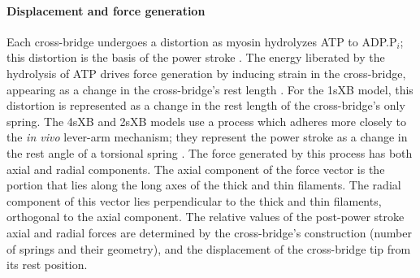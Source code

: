 \documentclass[10pt]{article}
\newcommand{\citep}[1]{\cite{#1}} %
\begin{document}
\paragraph{Displacement and force generation} %
Each cross-bridge undergoes a distortion as myosin hydrolyzes ATP to ADP.P$_i$; this distortion is the basis of the power stroke \citep{Pate1989, Daniel1998, Tanner2007}. 
The energy liberated by the hydrolysis of ATP drives force generation by inducing strain in the cross-bridge, appearing as a change in the cross-bridge's rest length \citep{HowardBook}.  
For the 1sXB model, this distortion is represented as a change in the rest length of the cross-bridge's only spring. 
The 4sXB and 2sXB models use a process which adheres more closely to the \emph{in vivo} lever-arm mechanism; they represent the power stroke as a change in the rest angle of a torsional spring \citep{Reedy2000}.
The force generated by this process has both axial and radial components. 
The axial component of the force vector is the portion that lies along the long axes of the thick and thin filaments. 
The radial component of this vector lies perpendicular to the thick and thin filaments, orthogonal to the axial component. 
The relative values of the post-power stroke axial and radial forces are determined by the cross-bridge's construction (number of springs and their geometry), and the displacement of the cross-bridge tip from its rest position. 
\end{document}
